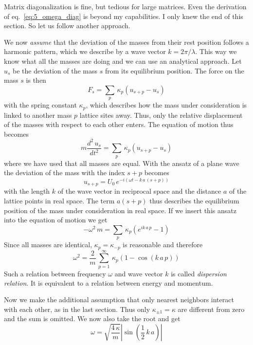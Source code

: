 Matrix diagonalization is fine, but tedious for large matrices. Even the derivation of eq.~\ref{eq:5_omega_diag} is beyond my capabilities. I only knew the end of this section. So let us follow another approach.

We now \emph{assume} that the deviation of the masses from their rest position follows a harmonic pattern, which we describe by a wave vector $k = 2 \pi / \lambda$. This way we know what all the masses are doing and we can use an analytical approach.
Let $u_s$ be the deviation of the mass $s$ from its equilibrium position. The force on the mass $s$ is then
\begin{equation}
  F_s = \sum_p \, \kappa_p \left( u_{s+p} - u_s \right)
\end{equation}
with the spring constant $\kappa_p$, which describes how the mass under consideration is  linked to another mass  $p$ lattice sites away. Thus, only the relative displacement of the masses with respect to each other enters. The equation of motion thus becomes
\begin{equation}
    m \frac{d^2 \, u_s}{dt^2} = \sum_p \, \kappa_p \left( u_{s+p} - u_s \right)
\end{equation}
where we have used that all masses are equal. With the ansatz of a plane wave the deviation of the mass with the index $s+p$ becomes
\begin{equation}
    u_{s+p} = U_0 \, e^{-i ( \omega t - k \, a \, (s+p) )}
\end{equation}
with the length $k$ of the wave vector in reciprocal space and the distance $a$ of the lattice points in real space. The term $a (s+p)$ thus describes the equilibrium position of the mass under consideration in real space. If we insert this ansatz into the equation of motion we get
\begin{equation}
- \omega^2 \, m = \sum_p \, \kappa_p \left( e^{i k \, a \, p} - 1 \right)
\end{equation}
Since all masses are identical, $\kappa_p = \kappa_{-p}$ is reasonable and therefore
\begin{equation}
    \omega^2 = \frac{2}{m} \, \sum_{p=1}^\infty \, \kappa_p \left( 1 - \cos ( k \, a \, p ) \right)
\end{equation}
Such a relation between frequency $\omega$ and wave vector $k$ is called  \emph{dispersion relation}. It is equivalent to a relation between energy and momentum.

Now we make the additional assumption that only nearest neighbors interact with each other, as in the last section. Thus only $\kappa_{\pm 1} = \kappa $ are different from zero and the sum is omitted. We now also take the root and get
\begin{equation}
\omega = \sqrt{\frac{4 \, \kappa}{m}} \left| \sin \left(\frac{1}{2} \, k \, a \right) \right| 
\end{equation}

